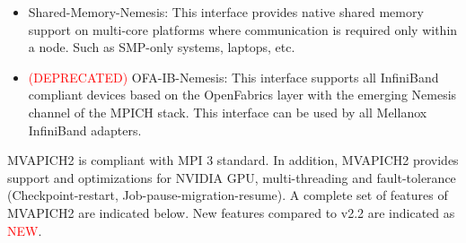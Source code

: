 \begin{itemize}
\item {Shared-Memory-Nemesis: 
        This interface provides native shared
	memory support on multi-core platforms where communication is
	required only within a node. Such as SMP-only systems, laptops,
	etc.}

\item {\textcolor{red}{(DEPRECATED)} OFA-IB-Nemesis:
        This interface supports all 
        InfiniBand compliant devices based on the  
        OpenFabrics layer with the emerging Nemesis 
        channel of the MPICH stack. 
        This interface can be used by all Mellanox InfiniBand adapters.}

\end{itemize}



MVAPICH2 \mvapichversion is compliant with MPI 3 standard. In addition, MVAPICH2
\mvapichversion provides support and optimizations for NVIDIA GPU,
multi-threading and fault-tolerance (Checkpoint-restart,
Job-pause-migration-resume).  A complete set of features of MVAPICH2
\mvapichversion are indicated below. New features compared to v2.2
are indicated as \textcolor{red}{NEW}. 

